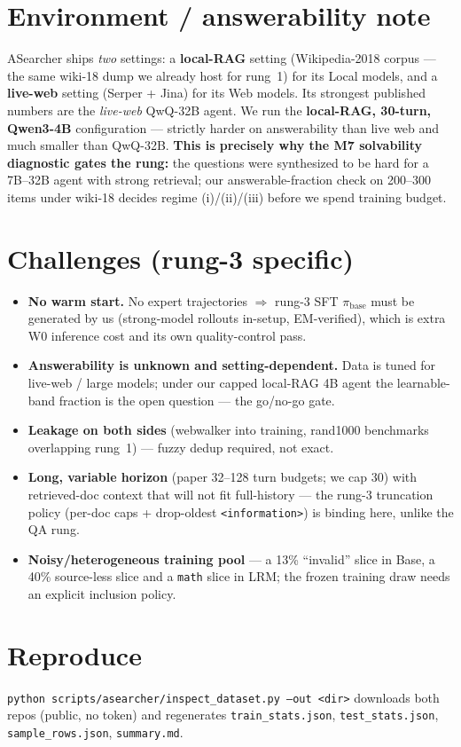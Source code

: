 \documentclass[10pt]{article}
\newcommand{\cmd}[1]{\texttt{\small #1}}
\begin{document}
\section{Environment / answerability note}
ASearcher ships \emph{two} settings: a \textbf{local-RAG} setting (Wikipedia-2018 corpus --- the same
wiki-18 dump we already host for rung~1) for its Local models, and a \textbf{live-web} setting (Serper +
Jina) for its Web models. Its strongest published numbers are the \emph{live-web} QwQ-32B agent. We run the
\textbf{local-RAG, 30-turn, Qwen3-4B} configuration --- strictly harder on answerability than live web and
much smaller than QwQ-32B. \textbf{This is precisely why the M7 solvability diagnostic gates the rung:} the
questions were synthesized to be hard for a 7B--32B agent with strong retrieval; our answerable-fraction
check on 200--300 items under wiki-18 decides regime (i)/(ii)/(iii) before we spend training budget.

\section{Challenges (rung-3 specific)}
\begin{itemize}
\item \textbf{No warm start.} No expert trajectories $\Rightarrow$ rung-3 SFT $\pi_\text{base}$ must be
generated by us (strong-model rollouts in-setup, EM-verified), which is extra W0 inference cost and its own
quality-control pass.
\item \textbf{Answerability is unknown and setting-dependent.} Data is tuned for live-web / large models;
under our capped local-RAG 4B agent the learnable-band fraction is the open question --- the go/no-go gate.
\item \textbf{Leakage on both sides} (webwalker into training, rand1000 benchmarks overlapping rung~1) ---
fuzzy dedup required, not exact.
\item \textbf{Long, variable horizon} (paper 32--128 turn budgets; we cap 30) with retrieved-doc context
that will not fit full-history --- the rung-3 truncation policy (per-doc caps + drop-oldest
\cmd{<information>}) is binding here, unlike the QA rung.
\item \textbf{Noisy/heterogeneous training pool} --- a 13\% ``invalid'' slice in Base, a 40\% source-less
slice and a \cmd{math} slice in LRM; the frozen training draw needs an explicit inclusion policy.
\end{itemize}

\section*{Reproduce}
\cmd{python scripts/asearcher/inspect\_dataset.py --out <dir>} downloads both repos (public, no token) and
regenerates \cmd{train\_stats.json}, \cmd{test\_stats.json}, \cmd{sample\_rows.json}, \cmd{summary.md}.
\end{document}
